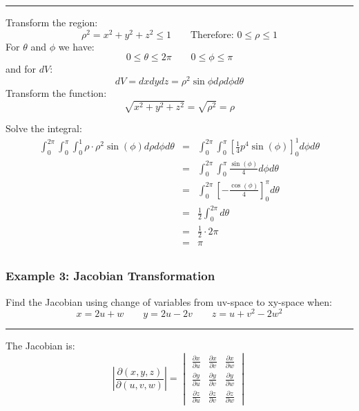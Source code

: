 \rule{\textwidth}{0.5pt}

Transform the region:
$$\rho^2=x^2+y^2+z^2\leq 1\qquad \text{Therefore: }0\leq\rho\leq 1$$
For $\theta$ and $\phi$ we have:
$$0\leq\theta\leq 2\pi\qquad 0\leq\phi\leq\pi$$
and for $dV$:
$$dV=dxdydz=\rho^2\sin\phi d\rho d\phi d\theta$$
Transform the function:
$$\sqrt{x^2+y^2+z^2}=\sqrt{\rho^2}=\rho$$

Solve the integral:
\begin{eqnarray*}
  \int_0^{2\pi}\int_0^\pi\int_0^1\rho\cdot\rho^2\sin(\phi) d\rho d\phi d\theta&=&\int_0^{2\pi}\int_0^\pi\left[\frac{1}{4} p^4 \sin (\phi)\right]^1_0d\phi d\theta\\
                                                                              &=& \int_0^{2\pi}\int_0^\pi\frac{\sin (\phi)}{4}d\phi d\theta\\
                                                                              &=& \int_0^{2\pi}\left[-\frac{\cos (\phi)}{4}\right]_0^\pi d\theta\\
                                                                              &=& \frac{1}{2}\int_0^{2\pi}d\theta\\
                                                                              &=& \frac{1}{2}\cdot 2\pi\\
                                                                              &=& \boxed{\pi}\\
\end{eqnarray*}

\subsubsection{Example 3: Jacobian Transformation}
Find the Jacobian using change of variables from uv-space to xy-space when:
$$x=2u+w\qquad y=2u-2v\qquad z=u+v^2-2w^2$$

\rule{\textwidth}{0.5pt}

The Jacobian is:
$$\left|\frac{\partial(x,y,z)}{\partial(u,v,w)}\right|=
\begin{vmatrix}
  \frac{\partial x}{\partial u}&\frac{\partial x}{\partial v}&\frac{\partial x}{\partial w}\\
  \frac{\partial y}{\partial u}&\frac{\partial y}{\partial v}&\frac{\partial y}{\partial w}\\
  \frac{\partial z}{\partial u}&\frac{\partial z}{\partial v}&\frac{\partial z}{\partial w}
\end{vmatrix}$$


